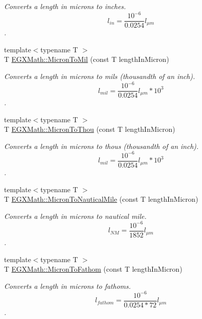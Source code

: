 \begin{DoxyCompactItemize}
\begin{DoxyCompactList}\small\item\em Converts a length in microns to inches. \[ l_{in}= \frac{10^{-6}}{0.0254} l_{\mu m} \]. \end{DoxyCompactList}\item 
{\footnotesize template$<$typename T $>$ }\\T \mbox{\hyperlink{group___e_g_x_math-_conversions-_length_conversions-_non-_s_i-_micron-_imperial_ga691931fc46e3fd33d4e2d83e09fa3db4}{E\+G\+X\+Math\+::\+Micron\+To\+Mil}} (const T length\+In\+Micron)
\begin{DoxyCompactList}\small\item\em Converts a length in microns to mils (thousandth of an inch). \[ l_{mil}= \frac{10^{-6}}{0.0254} l_{\mu m} * 10^{3} \]. \end{DoxyCompactList}\item 
{\footnotesize template$<$typename T $>$ }\\T \mbox{\hyperlink{group___e_g_x_math-_conversions-_length_conversions-_non-_s_i-_micron-_imperial_gaf75a5aad3349d690e8b1bea619fc8706}{E\+G\+X\+Math\+::\+Micron\+To\+Thou}} (const T length\+In\+Micron)
\begin{DoxyCompactList}\small\item\em Converts a length in microns to thous (thousandth of an inch). \[ l_{mil}= \frac{10^{-6}}{0.0254} l_{\mu m} * 10^{3} \]. \end{DoxyCompactList}\item 
{\footnotesize template$<$typename T $>$ }\\T \mbox{\hyperlink{group___e_g_x_math-_conversions-_length_conversions-_non-_s_i-_micron-_nautical_gaa3944ed4bca9dcd37c3043d44cc36bf1}{E\+G\+X\+Math\+::\+Micron\+To\+Nautical\+Mile}} (const T length\+In\+Micron)
\begin{DoxyCompactList}\small\item\em Converts a length in microns to nautical mile. \[ l_{NM}= \frac{10^{-6}}{1852} l_{\mu m} \]. \end{DoxyCompactList}\item 
{\footnotesize template$<$typename T $>$ }\\T \mbox{\hyperlink{group___e_g_x_math-_conversions-_length_conversions-_non-_s_i-_micron-_nautical_ga5cb74ac25926c826943b859a582a5e6a}{E\+G\+X\+Math\+::\+Micron\+To\+Fathom}} (const T length\+In\+Micron)
\begin{DoxyCompactList}\small\item\em Converts a length in microns to fathoms. \[ l_{fathom}= \frac{10^{-6}}{0.0254 * 72} l_{\mu m} \]. \end{DoxyCompactList}\item 

\end{DoxyCompactItemize}
